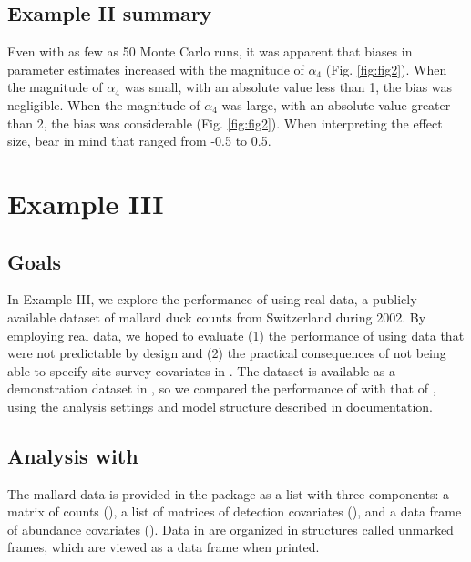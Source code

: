 \documentclass[codesnippet]{jss}
\begin{document}
\subsection[Example II summary]{Example II summary}
Even with as few as 50 Monte Carlo runs, it was apparent that biases in parameter estimates increased with the magnitude of $\alpha_4$ (Fig. \ref{fig:fig2}). When the magnitude of $\alpha_4$ was small, with an absolute value less than 1, the bias was negligible. When the magnitude of $\alpha_4$ was large, with an absolute value greater than 2, the bias was considerable (Fig. \ref{fig:fig2}). When interpreting the effect size, bear in mind that  ranged from -0.5 to 0.5.

\section[Example III]{Example III}
\subsection[Goals]{Goals}
In Example III, we explore the performance of  using real data, a publicly available dataset of mallard duck counts from Switzerland during 2002. By employing real data, we hoped to evaluate (1) the performance of  using data that were not predictable by design and (2) the practical consequences of not being able to specify site-survey covariates in . The dataset is available as a demonstration dataset in , so we compared the performance of  with that of , using the analysis settings and model structure described in  documentation.

\subsection[Analysis with R-INLA]{Analysis with }
The mallard data is provided in the  package as a list with three components: a matrix of counts (), a list of matrices of detection covariates (), and a data frame of abundance covariates (). Data in  are organized in structures called unmarked frames, which are viewed as a data frame when printed.
\end{document}

